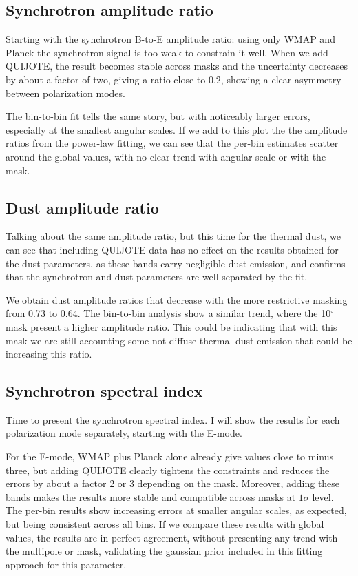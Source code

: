 \documentclass[12pt,a4paper]{article}
\begin{document}
\subsection{Synchrotron amplitude ratio}

Starting with the synchrotron B-to-E amplitude ratio: using only WMAP and Planck the synchrotron signal is too weak to constrain it well. When we add QUIJOTE, the result becomes stable across masks and the uncertainty decreases by about a factor of two, giving a ratio close to $0.2$, showing a clear asymmetry between polarization modes.

The bin-to-bin fit tells the same story, but with noticeably larger errors, especially at the smallest angular scales. If we add to this plot the the amplitude ratios from the power-law fitting, we can see that the per-bin estimates scatter around the global values, with no clear trend with angular scale or with the mask.

\subsection{Dust amplitude ratio}

Talking about the same amplitude ratio, but this time for the thermal dust, we can see that including QUIJOTE data has no effect on the results obtained for the dust parameters, as these bands carry negligible dust emission, and confirms that the synchrotron and dust parameters are well separated by the fit.

We obtain dust amplitude ratios that decrease with the more restrictive masking from 0.73 to 0.64. The bin-to-bin analysis show a similar trend, where the 10$^{\circ}$ mask present a higher amplitude ratio. This could be indicating that with this mask we are still accounting some not diffuse thermal dust emission that could be increasing this ratio.

\subsection{Synchrotron spectral index}

Time to present the synchrotron spectral index. I will show the results for each polarization mode separately, starting with the E-mode.

For the E-mode, WMAP plus Planck alone already give values close to minus three, but adding QUIJOTE clearly tightens the constraints and reduces the errors by about a factor 2 or 3 depending on the mask. Moreover, adding these bands makes the results more stable and compatible across masks at $1\sigma$ level. The per-bin results show increasing errors at smaller angular scales, as expected, but being consistent across all bins. If we compare these results with global values, the results are in perfect agreement, without presenting any trend with the multipole or mask, validating the gaussian prior included in this fitting approach for this parameter.
\end{document}

